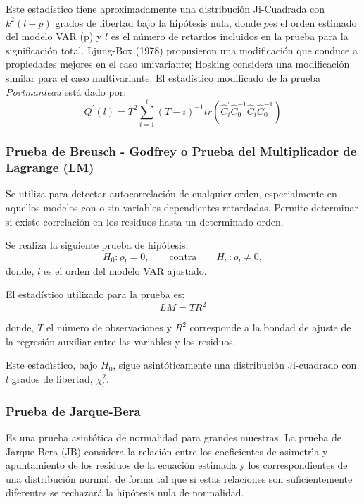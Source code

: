 Este estad\'{i}stico tiene aproximadamente una distribuci\'{o}n Ji-Cuadrada con $k^{2}(l-p)$ grados de libertad bajo la hip\'{o}tesis nula, donde $p $es el orden estimado del modelo VAR (p) y $l$ es el n\'{u}mero de retardos incluidos en la prueba para la significaci\'{o}n total. Ljung-Box (1978) propusieron una modificaci\'{o}n que conduce a propiedades mejores en el caso univariante; Hosking considera una modificaci\'{o}n similar para el caso multivariante. El estad\'{i}stico modificado de la prueba \textit{Portmanteau} est\'{a} dado por:
\[
Q^{'}(l)=T^{2}\sum_{i=1}^l {\left( T-i \right)^{-1}tr\left( \hat{C}_{i}^{'}\hat{C}_{0}^{-1}\hat{C}_{i}\hat{C}_{0}^{-1} \right)}
\]


\subsubsection{Prueba de Breusch - Godfrey o Prueba del Multiplicador de Lagrange (LM)}

Se utiliza para detectar autocorrelaci\'{o}n de cualquier orden, especialmente en aquellos modelos con o sin variables dependientes retardadas. Permite determinar si existe correlaci\'{o}n en los residuos hasta un determinado orden.\newline

Se realiza la siguiente prueba de hip\'{o}tesis:
\[
H_{0}:\rho_{l}=0,\qquad \text{contra}\qquad H_{a}:\rho_{l}\neq 0,
\]
donde, $l$ es el orden del modelo VAR ajustado.

El estad\'{i}stico utilizado para la prueba es: 
\[
LM=TR^{2}
\]

donde, $T$ el n\'{u}mero de observaciones y $R^{2}$ corresponde a la bondad de ajuste de la regresi\'{o}n auxiliar entre las variables y los residuos.\newline

Este estad\'{\i}stico, bajo $H_{0}$, sigue asint\'{o}ticamente una distribuci\'{o}n Ji-cuadrado con $l$ grados de libertad, $\chi_{l}^{2}$.

\subsubsection{Prueba de Jarque-Bera }

Es una prueba asint\'{o}tica de normalidad para grandes muestras. La prueba de Jarque-Bera (JB) considera la relaci\'{o}n entre los coeficientes de asimetr\'{\i}a y apuntamiento de los residuos de la ecuaci\'{o}n estimada y los correspondientes de una distribuci\'{o}n normal, de forma tal que si estas relaciones son suficientemente diferentes se rechazar\'{a} la hip\'{o}tesis nula de normalidad.

